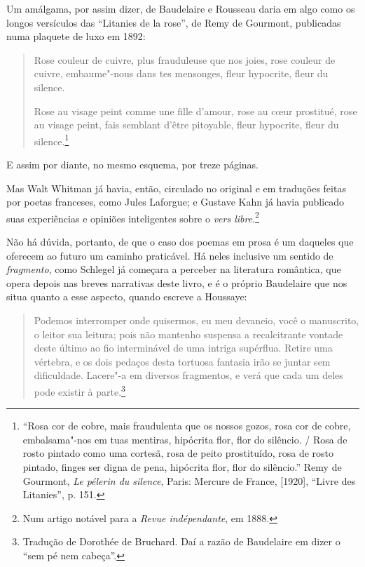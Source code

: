 Um amálgama, por assim dizer, de Baudelaire e Rousseau daria em algo
como os longos versículos das ``Litanies de la rose'', de Remy de
Gourmont, publicadas numa plaquete de luxo em 1892:

\begin{quote}
Rose couleur de cuivre, plus frauduleuse que nos joies, rose couleur de
cuivre, embaume"-nous dans tes mensonges, fleur hypocrite, fleur du
silence.

Rose au visage peint comme une fille d’amour, rose au
cœur prostitué, rose au visage peint, fais semblant
d’être pitoyable, fleur hypocrite, fleur du
silence.\footnote{ “Rosa cor de cobre, mais fraudulenta que os nossos gozos, rosa cor de
cobre, embalsama"-nos em tuas mentiras, hipócrita flor, flor do
silêncio. / Rosa de rosto pintado como uma cortesã, rosa de peito prostituído, rosa
de rosto pintado, finges ser digna de pena, hipócrita flor, flor do
silêncio.” Remy de Gourmont,  \textit{Le pélerin du silence}, Paris:
Mercure de France, [1920], “Livre des Litanies”, p. 151.}
\end{quote}

E assim por diante, no mesmo esquema, por treze páginas.

Mas Walt Whitman já havia, então, circulado no original e em traduções
feitas por poetas franceses, como Jules Laforgue; e Gustave Kahn já
havia publicado suas experiências e opiniões inteligentes sobre o
\textit{vers libre}.\footnote{ Num artigo notável para a \textit{Revue
indépendante}, em 1888.}

Não há dúvida, portanto, de que o caso dos poemas em prosa é um
daqueles que oferecem ao futuro um caminho praticável. Há
neles inclusive um sentido de \textit{fragmento}, como Schlegel já
começara a perceber na literatura romântica, que opera depois nas
breves narrativas deste livro, e é o próprio Baudelaire que nos situa
quanto a esse aspecto, quando escreve a Houssaye: 

\begin{quote}
Podemos interromper
onde quisermos, eu meu devaneio, você o manuscrito, o leitor sua
leitura; pois não mantenho suspensa a recalcitrante vontade deste
último ao fio interminável de uma intriga supérflua. Retire uma
vértebra, e os dois pedaços desta tortuosa fantasia irão se juntar sem
dificuldade. Lacere"-a em diversos fragmentos, e verá que cada um
deles pode existir à parte.\footnote{ Tradução de Dorothée de Bruchard.
Daí a razão de Baudelaire em dizer o “sem pé nem cabeça”.} 
\end{quote}

